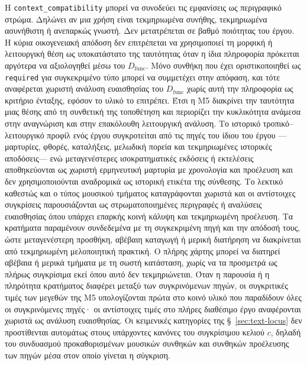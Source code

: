 \documentclass[11pt,a4paper]{article}
\begin{document}
Η \texttt{context\_compatibility} μπορεί να συνοδεύει τις εμφανίσεις ως περιγραφικό στρώμα. Δηλώνει αν μια χρήση είναι τεκμηριωμένα συνήθης, τεκμηριωμένα ασυνήθιστη ή ανεπαρκώς γνωστή. Δεν μετατρέπεται σε βαθμό ποιότητας του έργου. Η κύρια οικογενειακή απόδοση δεν επιτρέπεται να χρησιμοποιεί τη μορφική ή λειτουργική θέση ως υποκατάστατο της ταυτότητας όταν η ίδια πληροφορία πρόκειται αργότερα να αξιολογηθεί μέσω του $D_{\mathrm{func}}$. Μόνο συνθήκη που έχει οριστικοποιηθεί ως \texttt{required} για συγκεκριμένο τύπο μπορεί να συμμετέχει στην απόφαση, και τότε αναφέρεται χωριστή ανάλυση ευαισθησίας του $D_{\mathrm{func}}$ χωρίς αυτή την πληροφορία ως κριτήριο ένταξης, εφόσον το υλικό το επιτρέπει. Έτσι η M5 διακρίνει την ταυτότητα μιας θέσης από τη συνθετική της τοποθέτηση και περιορίζει την κυκλικότητα ανάμεσα στην αναγνώριση και στην επακόλουθη λειτουργική ανάλυση. Το ιστορικό τροπικό--λειτουργικό προφίλ ενός έργου συγκροτείται από τις πηγές του ίδιου του έργου ---μαρτυρίες, φθορές, καταλήξεις, μελωδική πορεία και τεκμηριωμένες ιστορικές αποδόσεις--- ενώ μεταγενέστερες ισοκρατηματικές εκδόσεις ή εκτελέσεις αποθηκεύονται ως χωριστή ερμηνευτική μαρτυρία με χρονολογία και προέλευση και δεν χρησιμοποιούνται αναδρομικά ως ιστορική ετικέτα της σύνθεσης. Το λεκτικό καθεστώς και ο τύπος μουσικού τμήματος καταγράφονται χωριστά και οι αντίστοιχες συγκρίσεις παρουσιάζονται ως στρωματοποιημένες περιγραφές ή αναλύσεις ευαισθησίας όπου υπάρχει επαρκής κοινή κάλυψη και τεκμηριωμένη προέλευση. Τα κρατήματα παραμένουν συνδεδεμένα με τη συγκεκριμένη πηγή και την απόδοσή τους, ώστε μεταγενέστερη προσθήκη, αβέβαιη καταγωγή ή μερική διατήρηση να διακρίνεται από τεκμηριωμένη μελοποιητική πρακτική. Ο πλήρης χάρτης μπορεί να διατηρεί αβέβαια ή μερικά τμήματα με τη σωστή κατάσταση, χωρίς να τα προσμετρά ως πλήρως συγκρίσιμα εκεί όπου αυτό δεν τεκμηριώνεται. Όταν η παρουσία ή η πληρότητα κρατήματος διαφέρει μεταξύ των συγκρινόμενων πηγών, οι συγκριτικές τιμές των μεγεθών της M5 υπολογίζονται πρώτα στο κοινό υλικό που παραδίδουν όλες οι συγκρινόμενες πηγές· οι αντίστοιχες τιμές στο πλήρες διαθέσιμο έργο αναφέρονται χωριστά ως ανάλυση ευαισθησίας. Οι κειμενικές κατηγορίες της §~\ref{sec:text-locus} δεν προστίθενται αυτομάτως στους υπάρχοντες κανόνες του συγκρίσιμου κελιού $c$, δηλαδή του συνδυασμού προκαθορισμένων μουσικών συνθηκών και συνθηκών προέλευσης των πηγών μέσα στον οποίο γίνεται η σύγκριση.
\end{document}
